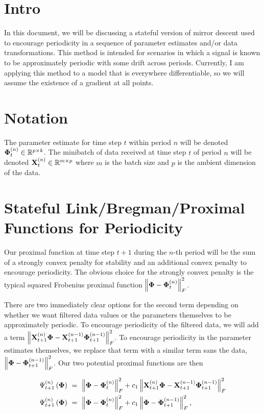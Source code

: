 \documentclass{article}
\begin{document}
	\section{Intro}
	In this document, we will be discussing a stateful version of mirror descent used to encourage periodicity in a sequence of parameter estimates and/or data transformations. This method is intended for scenarios in which a signal is known to be approximately periodic with some drift across periods. Currently, I am applying this method to a model that is everywhere differentiable, so we will assume the existence of a gradient at all points.

	\section{Notation}
	The parameter estimate for time step $t$ within period $n$ will be denoted $\mathbf{\Phi}_t^{(n)} \in \mathbb{R}^{p \times k}$. The minibatch of data received at time step $t$ of period $n$ will be denoted $\mathbf{X}_t^{(n)} \in \mathbb{R}^{m \times p}$ where $m$ is the batch size and $p$ is the ambient dimension of the data.

	\section{Stateful Link/Bregman/Proximal Functions for Periodicity}
	Our proximal function at time step $t+1$ during the $n$-th period will be the sum of a strongly convex penalty for stability and an additional convex penalty to encourage periodicity. The obvious choice for the strongly convex penalty is the typical squared Frobenius proximal function $\left\lVert\mathbf{\Phi} - \mathbf{\Phi}_t^{(n)}\right\rVert_F^2$. 
	
	There are two immediately clear options for the second term depending on whether we want filtered data values or the parameters themselves to be approximately periodic. To encourage periodicity of the filtered data, we will add a term $\left\lVert\mathbf{X}_{t+1}^{(n)}\mathbf{\Phi} - \mathbf{X}_{t+1}^{(n-1)}\mathbf{\Phi}_{t+1}^{(n-1)}\right\rVert_F^2$. To encourage periodicity in the parameter estimates themselves, we replace that term with a similar term sans the data, $\left\lVert\mathbf{\Phi} - \mathbf{\Phi}_{t+1}^{(n-1)}\right\rVert_F^2$. Our two potential proximal functions are then
	
	\begin{align}
		\Psi_{t+1}^{(n)} \left( \mathbf{\Phi} \right)\ &=\ \left\lVert\mathbf{\Phi} - \mathbf{\Phi}_t^{(n)}\right\rVert_F^2 + c_1 \left\lVert\mathbf{X}_{t+1}^{(n)}\mathbf{\Phi} - \mathbf{X}_{t+1}^{(n-1)}\mathbf{\Phi}_{t+1}^{(n-1)}\right\rVert_F^2\\
		\Psi_{t+1}^{(n)} \left( \mathbf{\Phi} \right)\ &=\ \left\lVert\mathbf{\Phi} - \mathbf{\Phi}_t^{(n)}\right\rVert_F^2 + c_1 \left\lVert\mathbf{\Phi} - \mathbf{\Phi}_{t+1}^{(n-1)}\right\rVert_F^2 \textnormal{,}
	\end{align}
	
\end{document}
